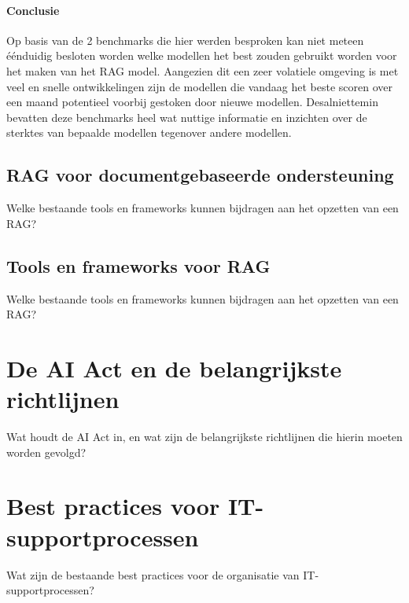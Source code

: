         
        \paragraph{Conclusie}
        Op basis van de 2 benchmarks die hier werden besproken kan niet meteen éénduidig besloten worden welke modellen het best zouden gebruikt worden voor het maken van het RAG model. Aangezien dit een zeer volatiele omgeving is met veel en snelle ontwikkelingen zijn de modellen die vandaag het beste scoren over een maand potentieel voorbij gestoken door nieuwe modellen. Desalniettemin bevatten deze benchmarks heel wat nuttige informatie en inzichten over de sterktes van bepaalde modellen tegenover andere modellen. 
     
    \subsection{RAG voor documentgebaseerde ondersteuning}
    Welke bestaande tools en frameworks kunnen bijdragen aan het opzetten van een RAG?
    
    \subsection{Tools en frameworks voor RAG}
    Welke bestaande tools en frameworks kunnen bijdragen aan het opzetten van een RAG?

\section{De AI Act en de belangrijkste richtlijnen}
Wat houdt de AI Act in, en wat zijn de belangrijkste richtlijnen die hierin moeten worden gevolgd?

\section{Best practices voor IT-supportprocessen}
Wat zijn de bestaande best practices voor de organisatie van IT-supportprocessen?
